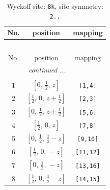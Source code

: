 \documentclass[fleqn,8pt]{jsarticle}
\begin{document}
\renewcommand{\arraystretch}{1.2}
\begin{longtable}{ccc}
\caption{Wyckoff site: {\tt 8k}, site symmetry: {\tt 2..}}
 \\
 \hline \hline
No. & position & mapping \\ \hline \endfirsthead

\multicolumn{2}{l}{\tablename\ \thetable{}} \\
 \hline \hline
No. & position & mapping \\ \hline \endhead

 \hline \hline
\multicolumn{2}{r}{\footnotesize\it continued ...} \\ \endfoot

 \hline \hline
\multicolumn{2}{r}{} \\ \endlastfoot

1 & $\left[ 0,\, \frac{1}{2},\, z \right]$ & {\tt [1,4]} \\ \hline
2 & $\left[ \frac{1}{2},\, 0,\, z + \frac{1}{2} \right]$ & {\tt [2,3]} \\ \hline
3 & $\left[ 0,\, \frac{1}{2},\, z + \frac{1}{2} \right]$ & {\tt [5,6]} \\ \hline
4 & $\left[ \frac{1}{2},\, 0,\, z \right]$ & {\tt [7,8]} \\ \hline
5 & $\left[ 0,\, \frac{1}{2},\, \frac{1}{2} - z \right]$ & {\tt [9,10]} \\ \hline
6 & $\left[ \frac{1}{2},\, 0,\, - z \right]$ & {\tt [11,12]} \\ \hline
7 & $\left[ 0,\, \frac{1}{2},\, - z \right]$ & {\tt [13,16]} \\ \hline
8 & $\left[ \frac{1}{2},\, 0,\, \frac{1}{2} - z \right]$ & {\tt [14,15]} \\
\end{longtable}
\renewcommand{\arraystretch}{1.2}
\end{document}
